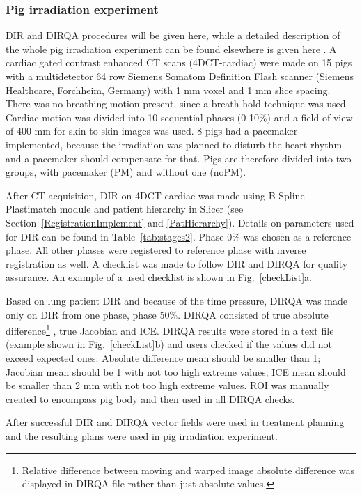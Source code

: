 \documentclass[type=dr, dr=rernat, accentcolor=tud7b,colorbacktitle, bigchapter, openright, twoside, 12pt ]{tudthesis}
\begin{document}
\subsubsection{Pig irradiation experiment}

DIR and DIRQA procedures will be given here, while a detailed description of the whole pig irradiation experiment can be found elsewhere is given here \cite{Lehmann2015}. A cardiac gated contrast enhanced CT scans (4DCT-cardiac) were made on 15 pigs with a multidetector 64 row Siemens Somatom Definition Flash scanner 
(Siemens Healthcare, Forchheim, Germany) with 1 mm voxel and 1 mm slice spacing. There was no breathing motion present, since a breath-hold technique was used. Cardiac motion was divided into 10 sequential phases (0-10\%) and a field of view of 400 mm for skin-to-skin images was used.
8 pigs had a pacemaker implemented, because the irradiation was planned to disturb the heart rhythm and a pacemaker should compensate for that. Pigs are therefore divided into two groups, with pacemaker (PM) and without one (noPM).

After CT acquisition, DIR on 4DCT-cardiac was made using B-Spline Plastimatch module and patient hierarchy in Slicer (see Section~\ref{RegistrationImplement} and \ref{PatHierarchy}). Details on parameters used for DIR can be found in Table~\ref{tab:stages2}. 
Phase 0\% was chosen as a reference phase. All other phases were registered to reference phase with inverse registration as well. A checklist was made to follow DIR and DIRQA for quality assurance. An example of a used checklist is shown in Fig.~\ref{checkList}a.

Based on lung patient DIR and because of the time pressure, DIRQA was made only on DIR from one phase, phase 50\%. DIRQA consisted of true absolute difference\footnote{Relative difference between moving and warped image absolute difference was displayed in DIRQA file rather than just absolute values.} 
, true Jacobian and ICE. DIRQA results were stored in a text file (example shown in Fig.~\ref{checkList}b) and users checked if the values did not exceed expected ones: Absolute difference
mean should be smaller than 1; Jacobian mean should be 1 with not too high extreme values; ICE mean should be smaller than 2 mm with not too high extreme values. ROI was manually created to encompass pig body and then used in all DIRQA checks.

After successful DIR and DIRQA vector fields were used in treatment planning and the resulting plans were used in pig irradiation experiment.
\end{document}
